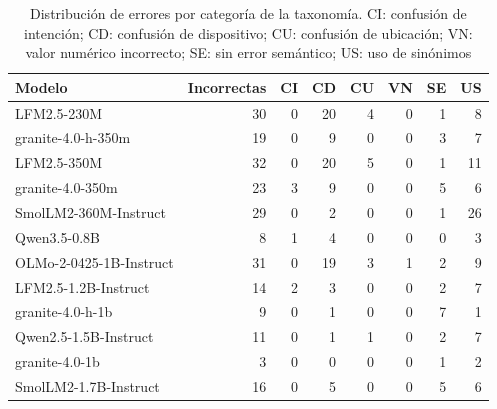 \begin{table}[htbp]
\centering
\caption{Distribución de errores por categoría de la taxonomía. CI: confusión de intención; CD: confusión de dispositivo; CU: confusión de ubicación; VN: valor numérico incorrecto; SE: sin error semántico; US: uso de sinónimos}
\label{tab:taxonomia}
{\footnotesize
\begin{tabular}{lrrrrrrr}
\toprule
Modelo & Incorrectas & CI & CD & CU & VN & SE & US \\
\midrule
LFM2.5-230M & 30 & 0 & 20 & 4 & 0 & 1 & 8 \\
granite-4.0-h-350m & 19 & 0 & 9 & 0 & 0 & 3 & 7 \\
LFM2.5-350M & 32 & 0 & 20 & 5 & 0 & 1 & 11 \\
granite-4.0-350m & 23 & 3 & 9 & 0 & 0 & 5 & 6 \\
SmolLM2-360M-Instruct & 29 & 0 & 2 & 0 & 0 & 1 & 26 \\
Qwen3.5-0.8B & 8 & 1 & 4 & 0 & 0 & 0 & 3 \\
OLMo-2-0425-1B-Instruct & 31 & 0 & 19 & 3 & 1 & 2 & 9 \\
LFM2.5-1.2B-Instruct & 14 & 2 & 3 & 0 & 0 & 2 & 7 \\
granite-4.0-h-1b & 9 & 0 & 1 & 0 & 0 & 7 & 1 \\
Qwen2.5-1.5B-Instruct & 11 & 0 & 1 & 1 & 0 & 2 & 7 \\
granite-4.0-1b & 3 & 0 & 0 & 0 & 0 & 1 & 2 \\
SmolLM2-1.7B-Instruct & 16 & 0 & 5 & 0 & 0 & 5 & 6 \\
\bottomrule
\end{tabular}
}
\end{table}
